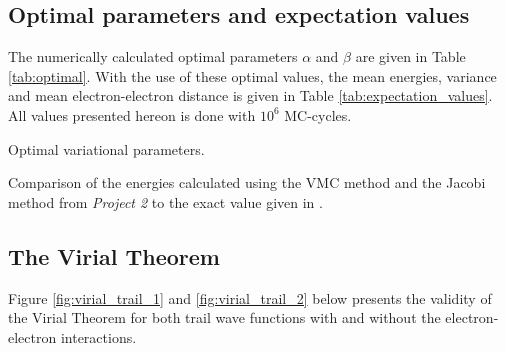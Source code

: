 \documentclass[12pt,english,a4paper]{article}
\begin{document}
\subsection{Optimal parameters and expectation values} \label{section:results:optimal}

The numerically calculated optimal parameters $\alpha$ and $\beta$ are given in Table \ref{tab:optimal}. With the use of these optimal values, the mean energies, variance and mean electron-electron distance is given in Table \ref{tab:expectation_values}. All values presented hereon is done with $10^6$ MC-cycles.

\begin{table}[htb]
    \centering
        \caption{Optimal variational parameters.}
        \label{tab:optimal}
\end{table}

\begin{table}[htb]
    \centering
        \caption{Comparison of the energies calculated using the VMC method and the Jacobi method from \textit{Project 2} to the exact value given in \cite{proj5}.}
        \label{tab:comparing}
\end{table}

\subsection{The Virial Theorem} \label{section:results:virial}

Figure \ref{fig:virial_trail_1} and \ref{fig:virial_trail_2} below presents the validity of the Virial Theorem for both trail wave functions with and without the electron-electron interactions.
\end{document}
